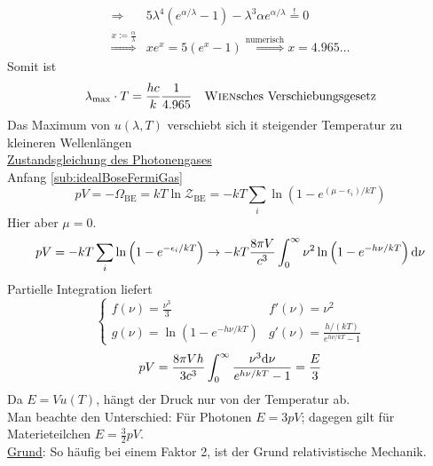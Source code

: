 \begin{enumerate}[A)]
\begin{equation}
\begin{split}
            \Rightarrow & 5 \lambda^4 \left( e^{\alpha / \lambda} -1 \right)- \lambda^3 \alpha e^{\alpha / \lambda} \overset{!}{=} 0 \\
            \overset{x := \frac{\alpha}{\lambda}}{\Rightarrow} & x e^x = 5(e^x - 1) \overset{ \text{numerisch}}{\Rightarrow} x = 4.965\ldots
        \end{split}
    \end{equation}
    Somit ist
    \begin{equation}
        \lambda_\text{max} \cdot T = \frac{h c}{k} \frac{1}{4.965} \quad \text{\textsc{Wien}sches Verschiebungsgesetz}
    \end{equation}
    Das Maximum von $u(\lambda, T)$ verschiebt sich it steigender Temperatur zu kleineren Wellenlängen \\
    \underline{Zustandsgleichung des Photonengases} \\
    Anfang \ref{sub:idealBoseFermiGas}
    \begin{equation}
        p V = - \Omega_\text{BE} = k T \ln \mathcal{Z}_\text{BE} = - k T \sum_i \ln \left( 1 - e^{(\mu - \epsilon_i) / k T} \right)
    \end{equation}
    Hier aber $\mu = 0$.
    \begin{equation}
        p V =  - k T \sum_i \ln \left( 1 - e^{-\epsilon_i / k T} \right) \rightarrow - k T \frac{8 \pi V}{c^3} \int_0^\infty \nu^2 \ln \left( 1 - e^{-h \nu / k T} \right) \mathrm{d} \nu
    \end{equation}
    Partielle Integration liefert
    \begin{equation}
        \begin{cases}
            f(\nu) = \frac{\nu^3}{3} & f'(\nu) = \nu^2 \\
            g(\nu) = \ln \left( 1 - e^{-h \nu / k T} \right) & g'(\nu) = \frac{h/(kT)}{e^{h \nu / k T} - 1}
        \end{cases}
    \end{equation}
    \begin{equation}
        p V = \frac{8 \pi V h}{3 c^3} \int_0^\infty \frac{\nu^3 \mathrm{d} \nu}{e^{h \nu / k T} - 1} = \frac{E}{3}
    \end{equation}
    Da $E = V u(T)$, hängt der Druck nur von der Temperatur ab. \\
    Man beachte den Unterschied: Für Photonen $E = 3 p V$; dagegen gilt für Materieteilchen $E = \frac{3}{2} p V$. \\
    \underline{Grund}: So häufig bei einem Faktor 2, ist der Grund relativistische Mechanik. \\

\end{enumerate}
